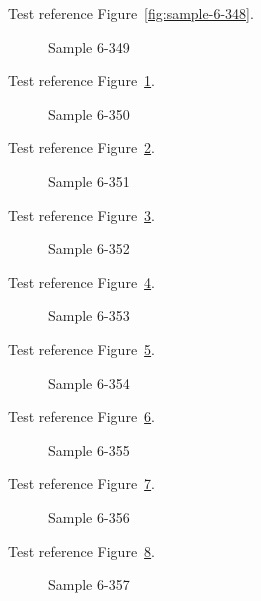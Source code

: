 Test reference Figure~\ref{fig:sample-6-348}.

\begin{figure}[tbhp]
\caption{Sample 6-349}
\label{fig:sample-6-349}
\end{figure}

Test reference Figure~\ref{fig:sample-6-349}.

\begin{figure}[tbhp]
\caption{Sample 6-350}
\label{fig:sample-6-350}
\end{figure}

Test reference Figure~\ref{fig:sample-6-350}.

\begin{figure}[tbhp]
\caption{Sample 6-351}
\label{fig:sample-6-351}
\end{figure}

Test reference Figure~\ref{fig:sample-6-351}.

\begin{figure}[tbhp]
\caption{Sample 6-352}
\label{fig:sample-6-352}
\end{figure}

Test reference Figure~\ref{fig:sample-6-352}.

\begin{figure}[tbhp]
\caption{Sample 6-353}
\label{fig:sample-6-353}
\end{figure}

Test reference Figure~\ref{fig:sample-6-353}.

\begin{figure}[tbhp]
\caption{Sample 6-354}
\label{fig:sample-6-354}
\end{figure}

Test reference Figure~\ref{fig:sample-6-354}.

\begin{figure}[tbhp]
\caption{Sample 6-355}
\label{fig:sample-6-355}
\end{figure}

Test reference Figure~\ref{fig:sample-6-355}.

\begin{figure}[tbhp]
\caption{Sample 6-356}
\label{fig:sample-6-356}
\end{figure}

Test reference Figure~\ref{fig:sample-6-356}.

\begin{figure}[tbhp]
\caption{Sample 6-357}
\label{fig:sample-6-357}
\end{figure}

